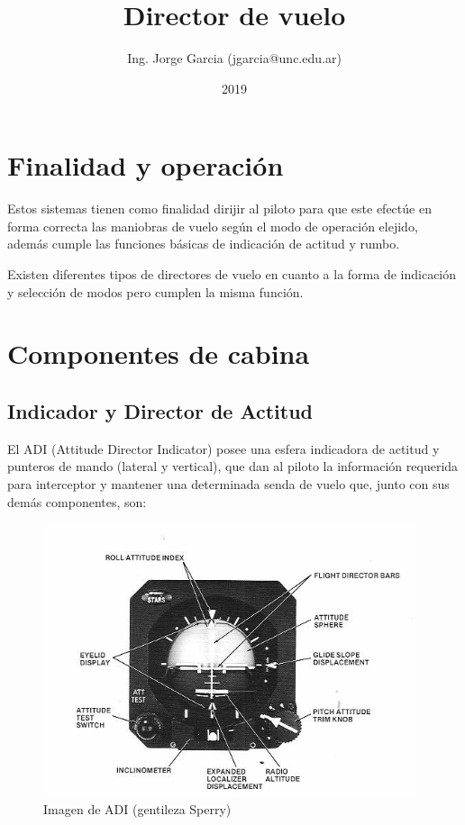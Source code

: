 \documentclass[a4paper,12pt,twoside]{article}
\title{Director de vuelo}
\author{Ing. Jorge Garcia (jgarcia@unc.edu.ar)}
\date{2019}
\begin{document}
\renewcommand{\tablename}{Tabla}

\newcommand{\ESPACIO}{\rule{0in}{3ex}}

\thispagestyle{fancy}
\maketitle

\thispagestyle{fancy}
\tableofcontents


\section{Finalidad y operaci\'on}
\label{sec:finalidad.y.operacion}


Estos sistemas tienen como finalidad dirijir al piloto para que este efect\'ue en forma correcta las maniobras de vuelo seg\'un el modo de operaci\'on elejido, adem\'as cumple las funciones b\'asicas de indicaci\'on de actitud y rumbo.

Existen diferentes tipos de directores de vuelo en cuanto a la forma de 
indicaci\'on y selecci\'on de modos pero cumplen la misma funci\'on.

\section{Componentes de cabina}
\label{sec:componentes.cabina}

\subsection{Indicador y Director de Actitud }
\label{sec:adi}

El ADI (Attitude Director Indicator)
 posee una esfera indicadora de actitud y punteros de 
mando (lateral y vertical), que dan al piloto la informaci\'on requerida
para interceptor y mantener una determinada senda de vuelo que, junto
con sus dem\'as componentes, son:

\begin{figure}[!h]\centering
  \includegraphics[width=0.98\textwidth]{imagenes/adi.png}
  \caption{Imagen de ADI (gentileza Sperry)}
\label{fig:adi.sperry}
\end{figure}
\end{document}
